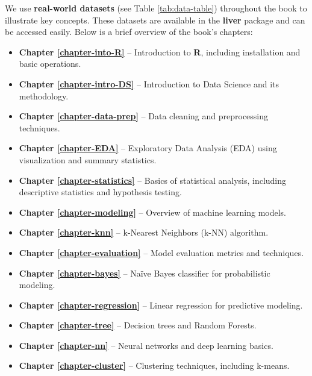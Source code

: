 \documentclass[
]{book}
\providecommand{\tightlist}{%
  \setlength{\itemsep}{0pt}\setlength{\parskip}{0pt}}
\theoremstyle{definition}
\theoremstyle{definition}
\theoremstyle{definition}
\theoremstyle{definition}
\theoremstyle{remark}
\begin{document}
We use \textbf{real-world datasets} (see Table \ref{tab:data-table}) throughout the book to illustrate key concepts. These datasets are available in the \textbf{liver} package and can be accessed easily. Below is a brief overview of the book's chapters:

\begin{itemize}
\tightlist
\item
  \textbf{Chapter \ref{chapter-into-R}} -- Introduction to \textbf{R}, including installation and basic operations.\\
\item
  \textbf{Chapter \ref{chapter-intro-DS}} -- Introduction to Data Science and its methodology.\\
\item
  \textbf{Chapter \ref{chapter-data-prep}} -- Data cleaning and preprocessing techniques.\\
\item
  \textbf{Chapter \ref{chapter-EDA}} -- Exploratory Data Analysis (EDA) using visualization and summary statistics.\\
\item
  \textbf{Chapter \ref{chapter-statistics}} -- Basics of statistical analysis, including descriptive statistics and hypothesis testing.\\
\item
  \textbf{Chapter \ref{chapter-modeling}} -- Overview of machine learning models.\\
\item
  \textbf{Chapter \ref{chapter-knn}} -- k-Nearest Neighbors (k-NN) algorithm.\\
\item
  \textbf{Chapter \ref{chapter-evaluation}} -- Model evaluation metrics and techniques.\\
\item
  \textbf{Chapter \ref{chapter-bayes}} -- Naïve Bayes classifier for probabilistic modeling.\\
\item
  \textbf{Chapter \ref{chapter-regression}} -- Linear regression for predictive modeling.\\
\item
  \textbf{Chapter \ref{chapter-tree}} -- Decision trees and Random Forests.\\
\item
  \textbf{Chapter \ref{chapter-nn}} -- Neural networks and deep learning basics.\\
\item
  \textbf{Chapter \ref{chapter-cluster}} -- Clustering techniques, including k-means.
\end{itemize}
\end{document}
